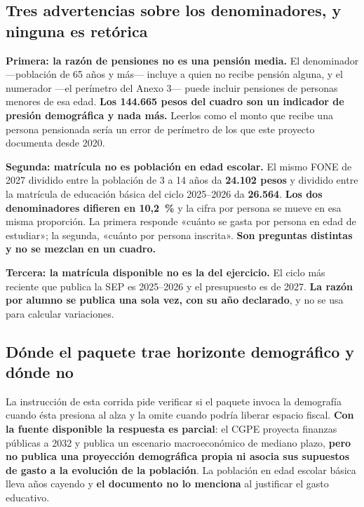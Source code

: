 

\subsection*{Tres advertencias sobre los denominadores, y ninguna es retórica}

\textbf{Primera: la razón de pensiones no es una pensión media.} El denominador
---población de 65 años y más--- incluye a quien no recibe pensión alguna, y el numerador
---el perímetro del Anexo 3--- puede incluir pensiones de personas menores de esa edad.
\textbf{Los 144.665 pesos del cuadro son un indicador de presión demográfica y nada más.}
Leerlos como el monto que recibe una persona pensionada sería un error de perímetro de los
que este proyecto documenta desde 2020.

\textbf{Segunda: matrícula no es población en edad escolar.} El mismo FONE de 2027 dividido
entre la población de 3 a 14 años da \textbf{24.102 pesos} y dividido entre la matrícula de
educación básica del ciclo 2025--2026 da \textbf{26.564}. \textbf{Los dos denominadores
difieren en 10,2~\%} y la cifra por persona se mueve en esa misma proporción. La primera
responde «cuánto se gasta por persona en edad de estudiar»; la segunda, «cuánto por persona
inscrita». \textbf{Son preguntas distintas y no se mezclan en un cuadro.}

\textbf{Tercera: la matrícula disponible no es la del ejercicio.} El ciclo más reciente que
publica la SEP es 2025--2026 y el presupuesto es de 2027. \textbf{La razón por alumno se
publica una sola vez, con su año declarado}, y no se usa para calcular variaciones.

\subsection*{Dónde el paquete trae horizonte demográfico y dónde no}

La instrucción de esta corrida pide verificar si el paquete invoca la demografía cuando ésta
presiona al alza y la omite cuando podría liberar espacio fiscal. \textbf{Con la fuente
disponible la respuesta es parcial}: el CGPE proyecta finanzas públicas a 2032 y publica un
escenario macroeconómico de mediano plazo, \textbf{pero no publica una proyección
demográfica propia ni asocia sus supuestos de gasto a la evolución de la población}. La
población en edad escolar básica lleva años cayendo y \textbf{el documento no lo menciona} al
justificar el gasto educativo.


